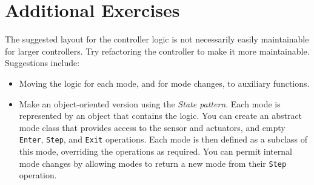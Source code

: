 \documentclass[11pt,a4paper]{../tutorial}
\begin{document}
\section{Additional Exercises}

The suggested layout for the controller logic is not necessarily easily maintainable for larger controllers. Try refactoring the controller to make it more maintainable. Suggestions include:

\begin{itemize}
\item Moving the logic for each mode, and for mode changes, to auxiliary functions.
\item Make an object-oriented version using the \emph{State pattern}. Each mode is represented by an object that contains the logic. You can create an abstract mode class that provides access to the sensor and actuators, and empty \texttt{Enter}, \texttt{Step}, and \texttt{Exit} operations. Each mode is then defined as a subclass of this mode, overriding the operations as required. You can permit internal mode changes by allowing modes to return a new mode from their \texttt{Step} operation.
\end{itemize}
\end{document}
